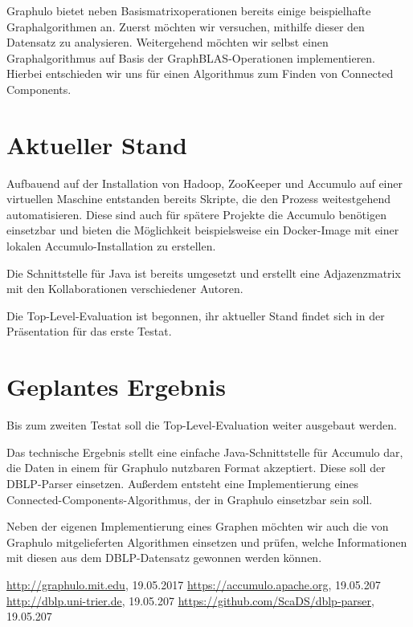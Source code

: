 \documentclass{article}
\begin{document}
Graphulo bietet neben Basismatrixoperationen bereits einige beispielhafte Graphalgorithmen an. Zuerst möchten wir versuchen, mithilfe dieser den Datensatz zu analysieren. Weitergehend möchten wir selbst einen Graphalgorithmus auf Basis der GraphBLAS-Operationen implementieren. Hierbei entschieden wir uns für einen Algorithmus zum Finden von Connected Components. 


\section{Aktueller Stand}

Aufbauend auf der Installation von Hadoop, ZooKeeper und Accumulo auf einer virtuellen Maschine entstanden bereits Skripte, die den Prozess weitestgehend automatisieren. Diese sind auch für spätere Projekte die Accumulo benötigen einsetzbar und bieten die Möglichkeit beispielsweise ein Docker-Image mit einer lokalen Accumulo-Installation zu erstellen.

Die Schnittstelle für Java ist bereits umgesetzt und erstellt eine Adjazenzmatrix mit den Kollaborationen verschiedener Autoren.

Die Top-Level-Evaluation ist begonnen, ihr aktueller Stand findet sich in der Präsentation für das erste Testat.


\section{Geplantes Ergebnis}

Bis zum zweiten Testat soll die Top-Level-Evaluation weiter ausgebaut werden.

Das technische Ergebnis stellt eine einfache Java-Schnittstelle für Accumulo dar, die Daten in einem für Graphulo nutzbaren Format akzeptiert. Diese soll der DBLP-Parser einsetzen. Außerdem entsteht eine Implementierung eines Connected-Components-Algorithmus, der in Graphulo einsetzbar sein soll.

Neben der eigenen Implementierung eines Graphen möchten wir auch die von Graphulo mitgelieferten Algorithmen einsetzen und prüfen, welche Informationen mit diesen aus dem DBLP-Datensatz gewonnen werden können.


\begin{thebibliography}{laengste Labelbreite}
	 \url{http://graphulo.mit.edu}, 19.05.2017
	 \url{https://accumulo.apache.org}, 19.05.207
	 \url{http://dblp.uni-trier.de}, 19.05.207
	 \url{https://github.com/ScaDS/dblp-parser}, 19.05.207
\end{thebibliography}
\end{document}
